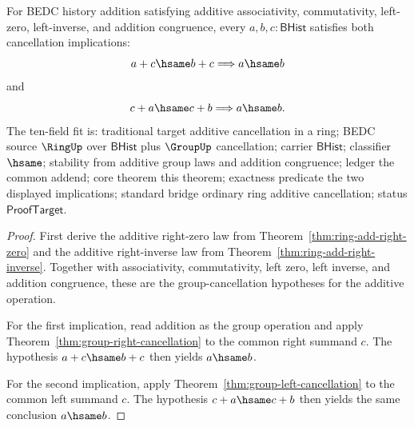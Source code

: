 \begin{theorem}
\label{thm:ring-additive-two-sided-cancellation}
For BEDC history addition satisfying additive associativity, commutativity,
left-zero, left-inverse, and addition congruence, every
$a,b,c:\mathsf{BHist}$ satisfies both cancellation implications:
$$
a+c\hsame b+c \Longrightarrow a\hsame b
$$
and
$$
c+a\hsame c+b \Longrightarrow a\hsame b.
$$
The ten-field fit is: traditional target additive cancellation in a ring; BEDC
source $\RingUp$ over $\mathsf{BHist}$ plus $\GroupUp$ cancellation; carrier
$\mathsf{BHist}$; classifier $\hsame$; stability from additive group laws and
addition congruence; ledger the common addend; core theorem this theorem;
exactness predicate the two displayed implications; standard bridge ordinary
ring additive cancellation; status $\mathsf{ProofTarget}$.
\end{theorem}
\begin{proof}
First derive the additive right-zero law from
Theorem~\ref{thm:ring-add-right-zero} and the additive right-inverse law from
Theorem~\ref{thm:ring-add-right-inverse}. Together with associativity,
commutativity, left zero, left inverse, and addition congruence, these are the
group-cancellation hypotheses for the additive operation.

For the first implication, read addition as the group operation and apply
Theorem~\ref{thm:group-right-cancellation} to the common right summand $c$.
The hypothesis $a+c\hsame b+c$ then yields $a\hsame b$.

For the second implication, apply
Theorem~\ref{thm:group-left-cancellation} to the common left summand $c$.
The hypothesis $c+a\hsame c+b$ then yields the same conclusion $a\hsame b$.
\end{proof}

